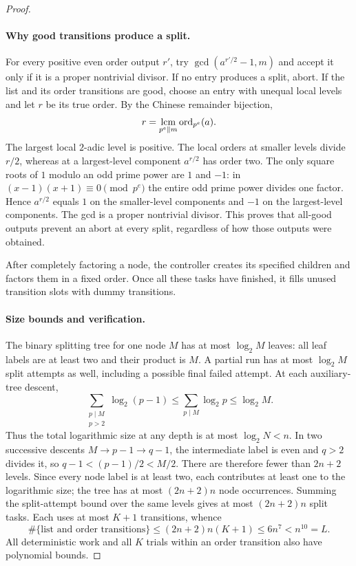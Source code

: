 \begin{proof}
\paragraph{Why good transitions produce a split.}
For every positive even order output $r'$, try
$\gcd(a^{r'/2}-1,m)$ and accept it only if it is a proper nontrivial
divisor.  If no entry produces a split, abort.
If the list and its order transitions are good, choose an entry with
unequal local levels and let $r$ be its true order.  By the Chinese
remainder bijection,
\[
 r=\operatorname*{lcm}_{p^e\parallel m}\operatorname{ord}_{p^e}(a).
\]
The largest local $2$-adic level is positive.  The local orders at smaller
levels divide $r/2$, whereas
at a largest-level component $a^{r/2}$ has order two.  The only square
roots of $1$ modulo an odd prime power are $1$ and $-1$: in
$(x-1)(x+1)\equiv0\pmod{p^e}$ the entire odd prime power divides one
factor.  Hence $a^{r/2}$ equals $1$ on the smaller-level components and
$-1$ on the largest-level components.  The gcd is a proper nontrivial
divisor.  This proves that all-good outputs prevent an abort at every
split, regardless of how those outputs were obtained.

After completely factoring a node, the controller creates its specified
children and factors them in a fixed order.  Once all these tasks have
finished, it fills unused transition slots with dummy transitions.

\paragraph{Size bounds and verification.}
The binary splitting tree for one node $M$ has at most $\log_2M$ leaves:
all leaf labels are at least two and their product is $M$.  A partial run
has at most $\log_2M$ split attempts as well, including a possible final
failed attempt.  At each auxiliary-tree descent,
\[
 \sum_{\substack{p\mid M\\p>2}}\log_2(p-1)
 \le\sum_{p\mid M}\log_2p\le\log_2M.
\]
Thus the total logarithmic size at any depth is at most $\log_2N<n$.
In two successive descents $M\to p-1\to q-1$, the intermediate label is
even and $q>2$ divides it, so $q-1<(p-1)/2<M/2$.
There are therefore fewer than $2n+2$ levels.  Since every node label is
at least two, each contributes at least one to the logarithmic size;
the tree has at most $(2n+2)n$ node occurrences.  Summing the split-attempt
bound over the same levels gives at most $(2n+2)n$ split tasks.
Each uses at most $K+1$ transitions, whence
\[
 \#\{\text{list and order transitions}\}
 \le(2n+2)n(K+1)\le6n^7<n^{10}=L.
\]
All deterministic work and all $K$ trials within an order transition
also have polynomial bounds.


\end{proof}
